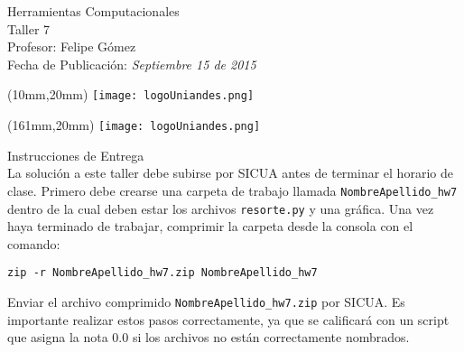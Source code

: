 \documentclass[11pt,letterpaper]{exam}
\begin{document}
\begin{center}
{\Large Herramientas Computacionales} \\
Taller 7 \\
Profesor: Felipe G\'omez\\
Fecha de Publicación: {\small \it Septiembre 15 de 2015}\\
\end{center}

\begin{textblock*}{40mm}(10mm,20mm)
  \texttt{[image: logoUniandes.png]}
\end{textblock*}

\begin{textblock*}{40mm}(161mm,20mm)
  \texttt{[image: logoUniandes.png]}
\end{textblock*}

\vspace{0.5cm}

{\Large Instrucciones de Entrega}\\

\noindent
La solución a este taller debe subirse por SICUA antes de terminar 
el horario de clase.
\noindent
Primero debe crearse una carpeta de trabajo llamada \verb"NombreApellido_hw7"
dentro de la cual deben estar los archivos \verb"resorte.py" y una gráfica. 
Una vez haya terminado de trabajar, comprimir la carpeta
desde la consola con el comando:

\verb"zip -r NombreApellido_hw7.zip NombreApellido_hw7"

\noindent Enviar el archivo comprimido \verb"NombreApellido_hw7.zip" por SICUA. 
Es importante realizar estos pasos correctamente, ya que se calificará con un
script que asigna la nota 0.0 si los archivos no están correctamente nombrados.
\end{document}
